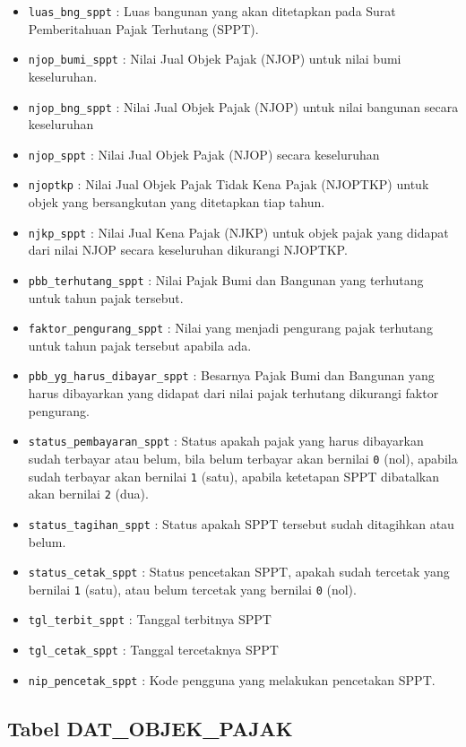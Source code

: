\begin{itemize}
	\item \texttt{luas\_bng\_sppt} : Luas bangunan yang akan ditetapkan pada Surat Pemberitahuan Pajak Terhutang (SPPT).
	\item \texttt{njop\_bumi\_sppt} : Nilai Jual Objek Pajak (NJOP) untuk nilai bumi keseluruhan.
	\item \texttt{njop\_bng\_sppt} : Nilai Jual Objek Pajak (NJOP) untuk nilai bangunan secara keseluruhan
	\item \texttt{njop\_sppt} : Nilai Jual Objek Pajak (NJOP) secara keseluruhan
	\item \texttt{njoptkp} : Nilai Jual Objek Pajak Tidak Kena Pajak (NJOPTKP) untuk objek yang bersangkutan yang ditetapkan tiap tahun.
	\item \texttt{njkp\_sppt} : Nilai Jual Kena Pajak (NJKP) untuk objek pajak yang didapat dari nilai NJOP secara keseluruhan dikurangi NJOPTKP.
	\item \texttt{pbb\_terhutang\_sppt} : Nilai Pajak Bumi dan Bangunan yang terhutang untuk tahun pajak tersebut.
	\item \texttt{faktor\_pengurang\_sppt} : Nilai yang menjadi pengurang pajak terhutang untuk tahun pajak tersebut apabila ada.
	\item \texttt{pbb\_yg\_harus\_dibayar\_sppt} : Besarnya Pajak Bumi dan Bangunan yang harus dibayarkan yang didapat dari nilai pajak terhutang dikurangi faktor pengurang.
	\item \texttt{status\_pembayaran\_sppt} : Status apakah pajak yang harus dibayarkan sudah terbayar atau belum, bila belum terbayar akan bernilai \texttt{0} (nol), apabila sudah terbayar akan bernilai \texttt{1} (satu), apabila ketetapan SPPT dibatalkan akan bernilai \texttt{2} (dua).
	\item \texttt{status\_tagihan\_sppt} : Status apakah SPPT tersebut sudah ditagihkan atau belum.
	\item \texttt{status\_cetak\_sppt} : Status pencetakan SPPT, apakah sudah tercetak yang bernilai \texttt{1} (satu), atau belum tercetak yang bernilai \texttt{0} (nol).
	\item \texttt{tgl\_terbit\_sppt} : Tanggal terbitnya SPPT
	\item \texttt{tgl\_cetak\_sppt} : Tanggal tercetaknya SPPT
	\item \texttt{nip\_pencetak\_sppt} : Kode pengguna yang melakukan pencetakan SPPT.
\end{itemize}

\subsection{Tabel DAT\_OBJEK\_PAJAK}

